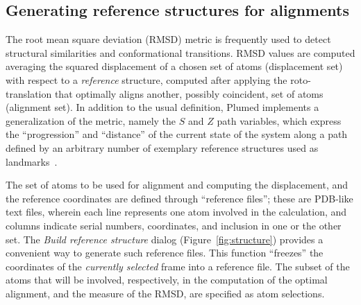 \documentclass[preprint,12pt]{elsarticle}
\begin{document}
\subsection{Generating reference structures for alignments}


The root mean square deviation (RMSD) metric is frequently used to
detect structural similarities and conformational transitions.  RMSD
values are computed averaging the squared displacement of a chosen set
of atoms (displacement set) with respect to a \emph{reference}
structure, computed after applying the roto-translation that optimally
aligns another, possibly coincident, set of atoms (alignment set).  In
addition to the usual definition, Plumed implements a generalization
of the metric, namely the $S$ and $Z$ path variables, which express
the ``progression'' and ``distance'' of the current state of the
system along a path defined by an arbitrary number of exemplary
reference structures used as
landmarks~\cite{Branduardi_Gervasio_Parrinello_2007}.



The set of atoms to be used for alignment and computing the
displacement, and the reference coordinates are defined through
``reference files''; these are PDB-like text files, wherein each line
represents one atom involved in the calculation, and columns indicate
serial numbers, coordinates, and inclusion in one or the other set.
The \emph{Build reference structure} dialog
(Figure~\ref{fig:structure}) provides a convenient way to generate
such reference files.  This function ``freezes'' the coordinates of the
\emph{currently selected} frame into a reference file. The subset of
the atoms that will be involved, respectively, in the computation of
the optimal alignment, and the measure of the RMSD, are specified as
atom selections.

\end{document}
